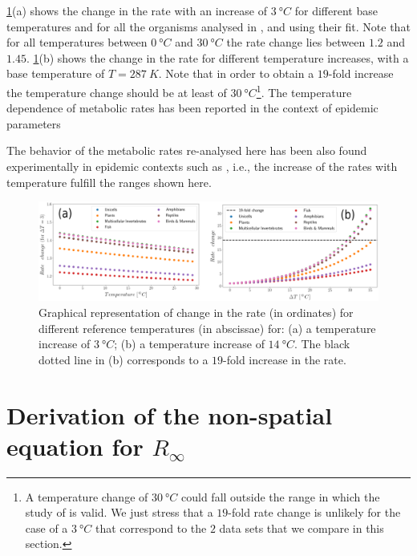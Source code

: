 \cref{fig:rate_changes}(a) shows the change in the rate with an increase of
$\SI{3}{\degree C}$ for different base temperatures and for all the organisms
analysed in \cite{Gillooly2248}, and using their fit. Note that for all
temperatures between $\SI{0}{\degree C}$  and $\SI{30}{\degree C}$ the rate
change lies between $1.2$ and $1.45$. \cref{fig:rate_changes}(b) shows the
change in the rate for different temperature increases, with a base temperature
of $T=\SI{287}{K}$. Note that in order to obtain a $19$-fold increase the
temperature change should be at least of $\SI{30}{\degree C}$\footnote{A
    temperature change of $\SI{30}{\degree C}$ could fall outside the range in
    which the study of \cite{Gillooly2248} is valid. We just stress that a
    $19$-fold rate change is unlikely for the case of a $\SI{3}{\degree C}$
    that
    correspond to the $2$ data sets that we compare in this section.}.
The temperature dependence of metabolic rates has been reported in the
context of epidemic parameters \cite{COELHO2006,Shapiro2017}

The behavior of the metabolic rates re-analysed here has been also found
experimentally in epidemic contexts such as \cite{COELHO2006, Shapiro2017},
i.e., the increase of the rates with temperature fulfill the ranges shown here.

\begin{figure}[H]
    \centering
    \includegraphics[width=1\textwidth]{Figures/arrhenius.png}
    \caption[Dependence of metabolic rates on temperature]{Graphical
        representation of change in the rate (in ordinates)
        for different reference temperatures (in abscissae) for: (a) a
        temperature
        increase of $\SI{3}{\degree C}$; (b)  a temperature increase of
        $\SI{14}{\degree C}$. The black dotted line in (b) corresponds to a
        $19$-fold
        increase in the rate.
    }
    \label{fig:rate_changes}
\end{figure}

\section{Derivation of the non-spatial equation for $R_{\infty}$}
\label{app:Rinf}

